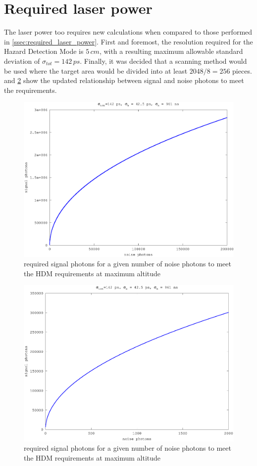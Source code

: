 \section{Required laser power}\label{ssec:HDM_required_laser_power} The laser power too requires new calculations when compared to those performed in \cref{ssec:required_laser_power}. First and foremost, the resolution required for the Hazard Detection Mode is $5\,cm$, with a resulting maximum allowable standard deviation of $\sigma_{tot}=142\,ps$. Finally, it was decided that a scanning method would be used where the target area would be divided into at least $2048/8=256$ pieces.  and \cref{fig:hdm_s_vs_n_small} show the updated relationship between signal and noise photons to meet the requirements.

\begin{figure}[h]
\centering
	\includegraphics[width=0.8\linewidth]{fig/hdm_s_vs_n.eps}
\caption{required signal photons for a given number of noise photons to meet the HDM requirements at maximum altitude}
\label{fig:hdm_s_vs_n}
\end{figure}

\begin{figure}[h]
\centering
	\includegraphics[width=0.8\linewidth]{fig/hdm_s_vs_n_small.eps}
\caption{required signal photons for a given number of noise photons to meet the HDM requirements at maximum altitude}
\label{fig:hdm_s_vs_n_small}
\end{figure}

